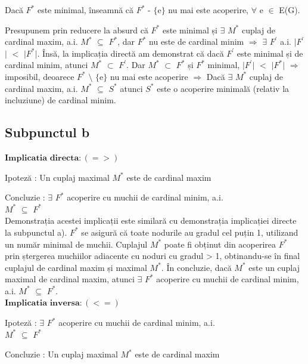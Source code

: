 \documentclass{article}
\begin{document}
{Dacă $F^*$ este minimal, înseamnă că $F^*$ - $\lbrace$e$\rbrace$ nu mai este acoperire, $\forall$ e $\in$ E(G). 

Presupunem prin reducere la absurd că $F^*$ este minimal și $\exists$ $M^*$ cuplaj de cardinal maxim, a.i. $M^*$ $\subseteq$ $F^*$, dar $F^*$ nu este de cardinal minim $\Rightarrow$ $\exists$ $F^{'}$ a.i. $\vert$$F^{'}$$\vert$ $<$ $\vert$$F^*$$\vert$. Însă, la implicația directă am demonstrat că dacă $F^{'}$ este minimal și de cardinal minim, atunci $M^*$ $\subset$ $F^{'}$. Dar $M^*$ $\subset$ $F^*$ și $F^*$ minimal, $\vert$$F^{'}$$\vert$ $<$ $\vert$$F^*$$\vert$ $\Rightarrow$ imposibil, deoarece $F^*$ $\setminus$ $\lbrace$e$\rbrace$  nu mai este acoperire $\Rightarrow$ Dacă $\exists$ $M^*$ cuplaj de cardinal maxim, a.i. $M^*$ $\subseteq$ $S^*$ atunci $S^*$ este o acoperire minimală (relativ la incluziune) de cardinal minim.  


\subsection*{\fontsize{16}{30}\selectfont Subpunctul b}
{\fontsize{14}{16}\selectfont 
$\mathbf{Implicatia}$ $\mathbf{directa: (=>)}$ 
\\
\par Ipoteză : Un cuplaj maximal $M^*$ este de cardinal maxim
\par Concluzie : $\exists$ $F^*$ acoperire cu muchii de cardinal minim, a.i. \\ $M^*$ $\subseteq$ $F^*$ 
\\



Demonstrația acestei implicații este similară cu demonstrația implicației directe la subpunctul a). $F^*$ se asigură că toate nodurile au gradul cel puțin 1, utilizand un număr minimal de muchii. Cuplajul $M^*$ poate fi obținut din acoperirea $F^*$ prin ștergerea muchiilor adiacente cu noduri cu gradul > 1, obtinandu-se în final cuplajul de cardinal maxim și maximal $M^*$. În concluzie, dacă $M^*$ este un cuplaj maximal de cardinal maxim, atunci $\exists$ $F^*$ acoperire cu muchii de cardinal minim, a.i. $M^*$ $\subseteq$ $F^*$. \\

$\mathbf{Implicatia}$ $\mathbf{inversa: (<=)}$ 
\\
\par Ipoteză : $\exists$ $F^*$ acoperire cu muchii de cardinal minim, a.i. \\ $M^*$ $\subseteq$ $F^*$ 
\par Concluzie : Un cuplaj maximal $M^*$ este de cardinal maxim
\\

}}
\end{document}
